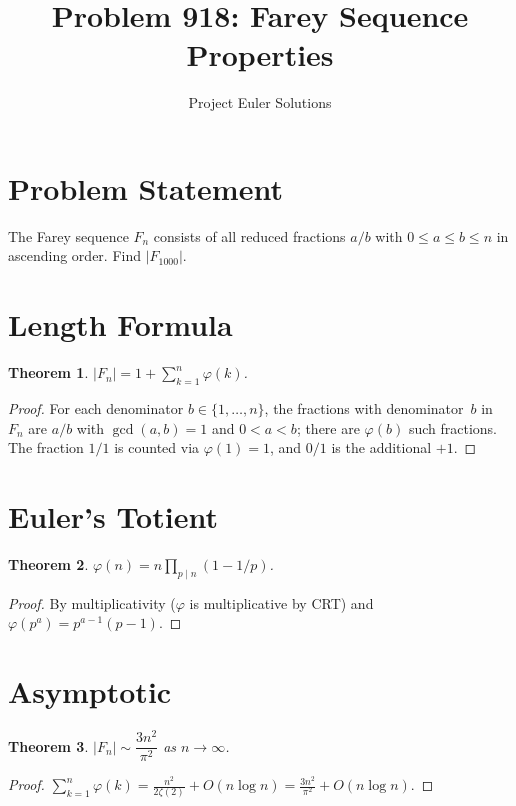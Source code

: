 \documentclass[11pt]{article}
\title{Problem 918: Farey Sequence Properties}
\author{Project Euler Solutions}
\date{}
\newtheorem{theorem}{Theorem}
\begin{document}
\maketitle

\section{Problem Statement}

The Farey sequence $F_n$ consists of all reduced fractions $a/b$ with $0 \le a \le b \le n$ in ascending order. Find $|F_{1000}|$.

\section{Length Formula}

\begin{theorem}
$|F_n| = 1 + \sum_{k=1}^{n} \varphi(k)$.
\end{theorem}

\begin{proof}
For each denominator $b \in \{1, \ldots, n\}$, the fractions with denominator~$b$ in $F_n$ are $a/b$ with $\gcd(a,b) = 1$ and $0 < a < b$; there are $\varphi(b)$ such fractions. The fraction $1/1$ is counted via $\varphi(1) = 1$, and $0/1$ is the additional $+1$.
\end{proof}

\section{Euler's Totient}

\begin{theorem}
$\varphi(n) = n \prod_{p \mid n}(1 - 1/p)$.
\end{theorem}

\begin{proof}
By multiplicativity ($\varphi$ is multiplicative by CRT) and $\varphi(p^a) = p^{a-1}(p-1)$.
\end{proof}

\section{Asymptotic}

\begin{theorem}
$|F_n| \sim \dfrac{3n^2}{\pi^2}$ as $n \to \infty$.
\end{theorem}

\begin{proof}
$\sum_{k=1}^{n}\varphi(k) = \frac{n^2}{2\zeta(2)} + O(n\log n) = \frac{3n^2}{\pi^2} + O(n\log n)$.
\end{proof}
\end{document}
